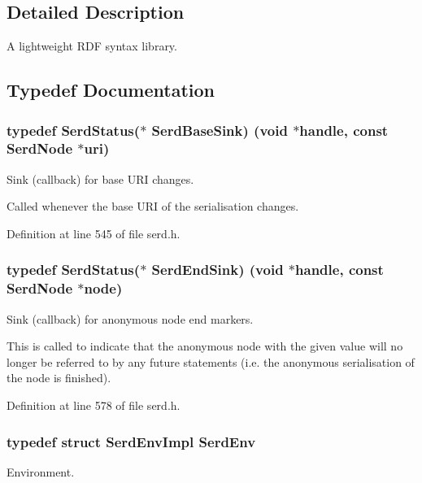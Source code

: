 \subsection{Detailed Description}
A lightweight R\+DF syntax library. 

\subsection{Typedef Documentation}
\subsubsection[{\texorpdfstring{Serd\+Base\+Sink}{SerdBaseSink}}]{\setlength{\rightskip}{0pt plus 5cm}typedef {\bf Serd\+Status}($\ast$ Serd\+Base\+Sink) ({\bf void} $\ast$handle, {\bf const} {\bf Serd\+Node} $\ast${\bf uri})}\hypertarget{group__serd_ga9f1652e78562130337b519f309dd5125}{}\label{group__serd_ga9f1652e78562130337b519f309dd5125}
Sink (callback) for base U\+RI changes.

Called whenever the base U\+RI of the serialisation changes. 

Definition at line 545 of file serd.\+h.

\subsubsection[{\texorpdfstring{Serd\+End\+Sink}{SerdEndSink}}]{\setlength{\rightskip}{0pt plus 5cm}typedef {\bf Serd\+Status}($\ast$ Serd\+End\+Sink) ({\bf void} $\ast$handle, {\bf const} {\bf Serd\+Node} $\ast${\bf node})}\hypertarget{group__serd_gae67888543462e4127e6a4f6af047026b}{}\label{group__serd_gae67888543462e4127e6a4f6af047026b}
Sink (callback) for anonymous node end markers.

This is called to indicate that the anonymous node with the given {\ttfamily value} will no longer be referred to by any future statements (i.\+e. the anonymous serialisation of the node is finished). 

Definition at line 578 of file serd.\+h.

\subsubsection[{\texorpdfstring{Serd\+Env}{SerdEnv}}]{\setlength{\rightskip}{0pt plus 5cm}typedef struct {\bf Serd\+Env\+Impl} {\bf Serd\+Env}}\hypertarget{group__serd_gaea4226dd80abea7afa05986f195d4755}{}\label{group__serd_gaea4226dd80abea7afa05986f195d4755}
Environment.

